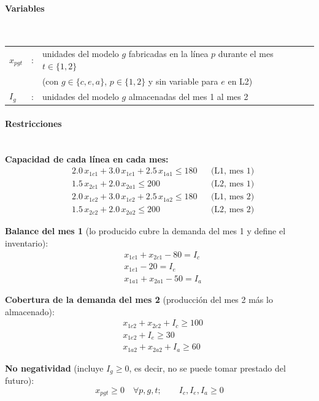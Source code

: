 \paragraph{Variables}\mbox{}\\
\begin{tabular}{l c l}
    $x_{pgt}$ & : & unidades del modelo $g$ fabricadas en la línea $p$ durante el mes $t\in\{1,2\}$ \\
                 &   & (con $g\in\{c,e,a\}$, $p\in\{1,2\}$ y sin variable para $e$ en L2) \\
    $I_g$        & : & unidades del modelo $g$ almacenadas del mes 1 al mes 2 \\
\end{tabular}

\paragraph{Restricciones}\mbox{}\\
\textbf{Capacidad de cada línea en cada mes:}
\begin{align}
    & 2.0\,x_{1c1} + 3.0\,x_{1e1} + 2.5\,x_{1a1} \leq 180 && \text{(L1, mes 1)}\\
    & 1.5\,x_{2c1} + 2.0\,x_{2a1} \leq 200 && \text{(L2, mes 1)}\\
    & 2.0\,x_{1c2} + 3.0\,x_{1e2} + 2.5\,x_{1a2} \leq 180 && \text{(L1, mes 2)}\\
    & 1.5\,x_{2c2} + 2.0\,x_{2a2} \leq 200 && \text{(L2, mes 2)}
\end{align}

\textbf{Balance del mes 1} (lo producido cubre la demanda del mes 1 y define el inventario):
\begin{align}
    & x_{1c1} + x_{2c1} - 80 = I_c \\
    & x_{1e1} - 20 = I_e \\
    & x_{1a1} + x_{2a1} - 50 = I_a
\end{align}

\textbf{Cobertura de la demanda del mes 2} (producción del mes 2 más lo almacenado):
\begin{align}
    & x_{1c2} + x_{2c2} + I_c \geq 100 \\
    & x_{1e2} + I_e \geq 30 \\
    & x_{1a2} + x_{2a2} + I_a \geq 60
\end{align}

\textbf{No negatividad} (incluye $I_g\ge 0$, es decir, no se puede tomar prestado del futuro):
\begin{equation}
    x_{pgt} \geq 0 \quad \forall p,g,t; \qquad I_c, I_e, I_a \geq 0
\end{equation}


